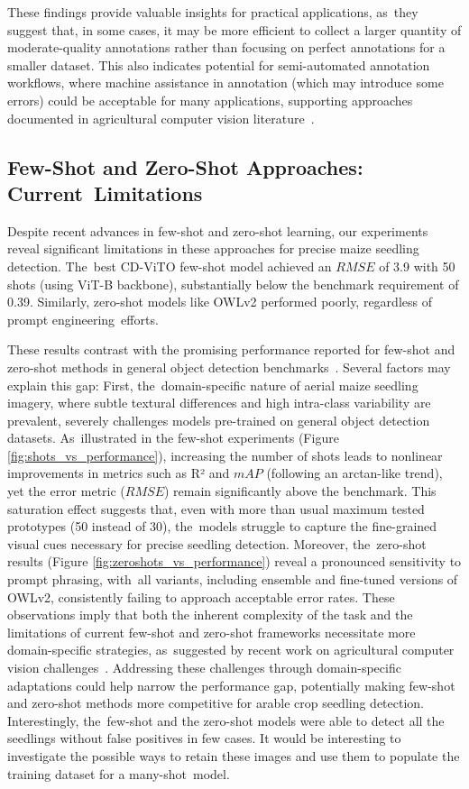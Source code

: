 \documentclass[12pt,a4paper,oneside]{report}
\begin{document}
These findings provide valuable insights for practical applications, as~they suggest that, in some 
cases, it may be more efficient to collect a larger quantity of moderate-quality annotations 
rather than focusing on perfect annotations for a smaller dataset. This also indicates potential 
for semi-automated annotation workflows, where machine assistance in annotation (which may introduce 
some errors) could be acceptable for many applications, supporting approaches documented in 
agricultural computer vision literature~\cite{badgujarAgriculturalObjectDetection2024}.

\subsection{Few-Shot and Zero-Shot Approaches: Current~Limitations}
Despite recent advances in few-shot and zero-shot learning, our experiments reveal significant 
limitations in these approaches for precise maize seedling detection. The~best CD-ViTO few-shot 
model achieved an $RMSE$ of 3.9 with 50 shots (using ViT-B backbone), substantially below the benchmark 
requirement of 0.39. Similarly, zero-shot models like OWLv2 performed poorly, regardless of prompt 
engineering~efforts.

These results contrast with the promising performance reported for few-shot and zero-shot methods 
in general object detection benchmarks~\cite{xuDeViTDecomposingVision2023,mindererScalingOpenVocabularyObject2023}. 
Several factors may explain this gap: 
First, the~domain-specific nature of aerial maize seedling imagery, where subtle 
textural differences and high intra-class variability are prevalent, severely challenges 
models pre-trained on general object detection datasets. As~illustrated in the few-shot 
experiments (Figure \ref{fig:shots_vs_performance}), increasing 
the number of shots leads to nonlinear improvements in metrics such as R² and $mAP$ 
(following an arctan-like trend), yet the error metric ($RMSE$) remain significantly 
above the benchmark. This saturation effect suggests that, even with more than usual maximum tested
prototypes (50 instead of 30), the~models struggle to capture the fine-grained visual cues 
necessary for precise seedling detection. Moreover, the~zero-shot results (Figure 
\ref{fig:zeroshots_vs_performance}) reveal a pronounced sensitivity to prompt phrasing, with~all 
variants, including ensemble and fine-tuned versions of OWLv2, consistently failing 
to approach acceptable error rates. These observations imply that both the inherent 
complexity of the task and the limitations of current few-shot and zero-shot frameworks 
necessitate more domain-specific strategies, as~suggested by recent work on agricultural 
computer vision challenges~\cite{farjon_deep-learning-based_2023}. Addressing these challenges through 
domain-specific adaptations could help narrow the performance gap, potentially making 
few-shot and zero-shot methods more competitive for arable crop seedling detection.
Interestingly, the~few-shot and the zero-shot models were able to detect all the seedlings
without false positives in few cases. It would be interesting to investigate the
possible ways to retain these images and use them to populate the training dataset
for a many-shot~model.
\end{document}
